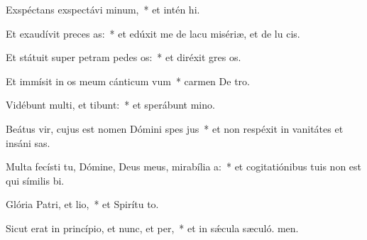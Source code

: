 \item Exspéctans exspectávi minum,~* et intén hi.
\item Et exaudívit preces as:~* et edúxit me de lacu misériæ, et de lu cis.
\item Et státuit super petram pedes os:~* et diréxit gres os.
\item Et immísit in os meum cánticum vum~* carmen De tro.
\item Vidébunt multi, et tibunt:~* et sperábunt  mino.
\item Beátus vir, cujus est nomen Dómini spes jus~* et non respéxit in vanitátes et insáni sas.
\item Multa fecísti tu, Dómine, Deus meus, mirabília a:~* et cogitatiónibus tuis non est qui símilis  bi.
\item Glória Patri, et lio,~* et Spirítu to.
\item Sicut erat in princípio, et nunc, et per,~* et in sǽcula sæculó. men.

